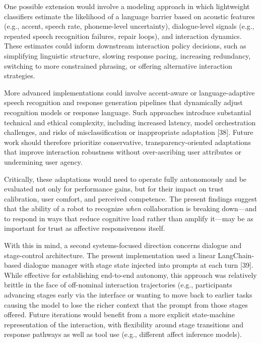 \documentclass[
  letterpaper,
  DIV=11,
  numbers=noendperiod]{scrartcl}
\begin{document}
One possible extension would involve a modeling approach in which
lightweight classifiers estimate the likelihood of a language barrier
based on acoustic features (e.g., accent, speech rate, phoneme-level
uncertainty), dialogue-level signals (e.g., repeated speech recognition
failures, repair loops), and interaction dynamics. These estimates could
inform downstream interaction policy decisions, such as simplifying
linguistic structure, slowing response pacing, increasing redundancy,
switching to more constrained phrasing, or offering alternative
interaction strategies.

More advanced implementations could involve accent-aware or
language-adaptive speech recognition and response generation pipelines
that dynamically adjust recognition models or response language. Such
approaches introduce substantial technical and ethical complexity,
including increased latency, model orchestration challenges, and risks
of misclassification or inappropriate adaptation {[}38{]}. Future work
should therefore prioritize conservative, transparency-oriented
adaptations that improve interaction robustness without over-ascribing
user attributes or undermining user agency.

Critically, these adaptations would need to operate fully autonomously
and be evaluated not only for performance gains, but for their impact on
trust calibration, user comfort, and perceived competence. The present
findings suggest that the ability of a robot to recognize \emph{when}
collaboration is breaking down---and to respond in ways that reduce
cognitive load rather than amplify it---may be as important for trust as
affective responsiveness itself.

With this in mind, a second systems-focused direction concerns dialogue
and stage-control architecture. The present implementation used a linear
LangChain-based dialogue manager with stage state injected into prompts
at each turn {[}39{]}. While effective for establishing end-to-end
autonomy, this approach was relatively brittle in the face of
off-nominal interaction trajectories (e.g., participants advancing
stages early via the interface or wanting to move back to earlier tasks
causing the model to lose the richer context that the prompt from those
stages offered. Future iterations would benefit from a more explicit
state-machine representation of the interaction, with flexibility around
stage transitions and response pathways as well as tool use (e.g.,
different affect inference models).
\end{document}
